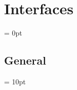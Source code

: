 
\section{Interfaces} 


\parskip = 0pt

\vspace{3mm} \subsection*{General}

\vspace{5mm}\parskip = 10pt 

